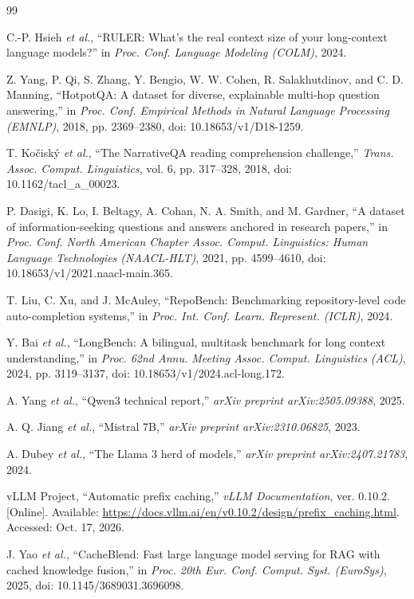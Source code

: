 \begin{thebibliography}{99}

C.-P. Hsieh \emph{et al.}, ``RULER: What's the real context size of your long-context language models?'' in \emph{Proc. Conf. Language Modeling (COLM)}, 2024.

Z. Yang, P. Qi, S. Zhang, Y. Bengio, W. W. Cohen, R. Salakhutdinov, and C. D. Manning, ``HotpotQA: A dataset for diverse, explainable multi-hop question answering,'' in \emph{Proc. Conf. Empirical Methods in Natural Language Processing (EMNLP)}, 2018, pp. 2369--2380, doi: 10.18653/v1/D18-1259.

T. Ko\v{c}isk\'{y} \emph{et al.}, ``The NarrativeQA reading comprehension challenge,'' \emph{Trans. Assoc. Comput. Linguistics}, vol. 6, pp. 317--328, 2018, doi: 10.1162/tacl\_a\_00023.

P. Dasigi, K. Lo, I. Beltagy, A. Cohan, N. A. Smith, and M. Gardner, ``A dataset of information-seeking questions and answers anchored in research papers,'' in \emph{Proc. Conf. North American Chapter Assoc. Comput. Linguistics: Human Language Technologies (NAACL-HLT)}, 2021, pp. 4599--4610, doi: 10.18653/v1/2021.naacl-main.365.

T. Liu, C. Xu, and J. McAuley, ``RepoBench: Benchmarking repository-level code auto-completion systems,'' in \emph{Proc. Int. Conf. Learn. Represent. (ICLR)}, 2024.

Y. Bai \emph{et al.}, ``LongBench: A bilingual, multitask benchmark for long context understanding,'' in \emph{Proc. 62nd Annu. Meeting Assoc. Comput. Linguistics (ACL)}, 2024, pp. 3119--3137, doi: 10.18653/v1/2024.acl-long.172.

A. Yang \emph{et al.}, ``Qwen3 technical report,'' \emph{arXiv preprint arXiv:2505.09388}, 2025.

A. Q. Jiang \emph{et al.}, ``Mistral 7B,'' \emph{arXiv preprint arXiv:2310.06825}, 2023.

A. Dubey \emph{et al.}, ``The Llama 3 herd of models,'' \emph{arXiv preprint arXiv:2407.21783}, 2024.

vLLM Project, ``Automatic prefix caching,'' \emph{vLLM Documentation}, ver. 0.10.2. [Online]. Available: \url{https://docs.vllm.ai/en/v0.10.2/design/prefix_caching.html}. Accessed: Oct. 17, 2026.

J. Yao \emph{et al.}, ``CacheBlend: Fast large language model serving for RAG with cached knowledge fusion,'' in \emph{Proc. 20th Eur. Conf. Comput. Syst. (EuroSys)}, 2025, doi: 10.1145/3689031.3696098.

\end{thebibliography}
